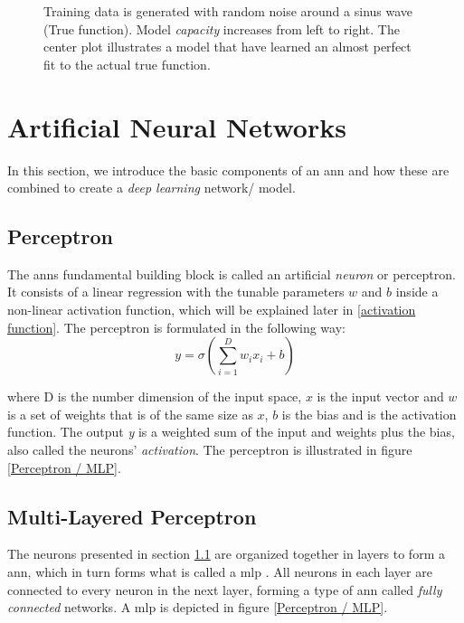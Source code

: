         \begin{figure}[H]
            \centering
            
            \caption[Over/under-fit]{Training data is generated with random noise around a sinus wave (True function). Model \textit{capacity} increases from left to right. The center plot illustrates a model that have learned an almost perfect fit to the actual true function.}
          	\medskip 
            \label{over/under fit fig}
        \end{figure}
        
        
\section{Artificial Neural Networks} \label{neural networks}
    In this section, we introduce the basic components of an \gls{ann} and how these are combined to create a \textit{deep learning} network/ model. 

    \subsection{Perceptron} \label{perceptron}
        The \gls{ann}s fundamental building block is called an artificial \textit{neuron} or perceptron. It consists of a linear regression with the tunable parameters $w$ and $b$ inside a non-linear activation function, which will be explained later in \ref{activation function}. The perceptron is formulated in the following way\cite{razavi2021deep_exp_per}:
            \begin{equation} \label{eq_perceptron}
                y = \sigma(\sum_{i=1}^{D}w_ix_i + b)
            \end{equation}
            
        where D is the number dimension of the input space, $x$ is the input vector and $w$ is a set of weights that is of the same size as $x$, $b$ is the bias and {\textsigma} is the activation function. The output \textit{y} is a weighted sum of the input and weights plus the bias, also called the neurons' \textit{activation}. The perceptron is illustrated in figure \ref{Perceptron / MLP}.
    
    \subsection{Multi-Layered Perceptron} \label{MLP}
        The neurons presented in section \ref{perceptron} are organized together in layers to form a \gls{ann}, which in turn forms what is called a \gls{mlp} \cite{razavi2021deep_exp_per}. All neurons in each layer are connected to every neuron in the next layer, forming a type of \gls{ann} called \textit{fully connected} networks. A \gls{mlp} is depicted in figure \ref{Perceptron / MLP}.
        

